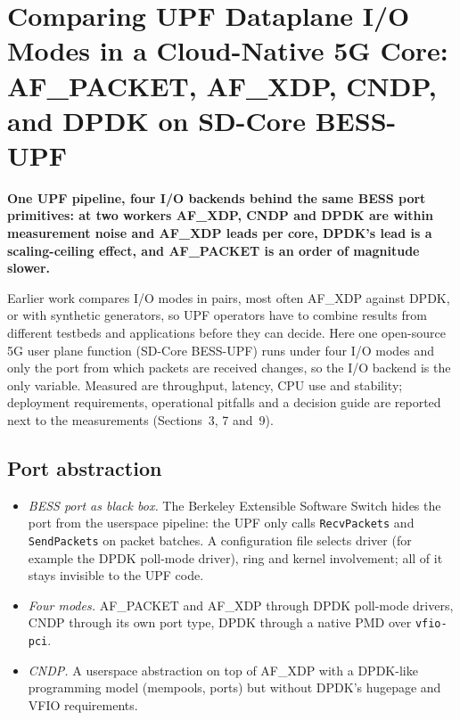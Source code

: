 \documentclass[11pt,a4paper]{article}
\newcommand{\finding}[1]{\textbf{#1}\par\smallskip}
\begin{document}
\null %
\clearpage

\begingroup
\small
\section*{\large\normalfont Comparing UPF Dataplane I/O Modes in a Cloud-Native 5G Core: AF\_PACKET, AF\_XDP, CNDP, and DPDK on SD-Core BESS-UPF~\cite{valia2026}}
\finding{One UPF pipeline, four I/O backends behind the same BESS port primitives: at two workers AF\_XDP, CNDP and DPDK are within measurement noise and AF\_XDP leads per core, DPDK's lead is a scaling-ceiling effect, and AF\_PACKET is an order of magnitude slower.}
Earlier work compares I/O modes in pairs, most often AF\_XDP against DPDK, or with synthetic generators, so UPF operators have to combine results from different testbeds and applications before they can decide.
Here one open-source 5G user plane function (SD-Core BESS-UPF) runs under four I/O modes and only the port from which packets are received changes, so the I/O backend is the only variable.
Measured are throughput, latency, CPU use and stability; deployment requirements, operational pitfalls and a decision guide are reported next to the measurements (Sections~3, 7 and~9).

\subsection*{\normalsize\normalfont Port abstraction}
\begin{itemize}
\setlength{\itemsep}{2pt}
\item \emph{BESS port as black box.}
The Berkeley Extensible Software Switch hides the port from the userspace pipeline: the UPF only calls \texttt{RecvPackets} and \texttt{SendPackets} on packet batches.
A configuration file selects driver (for example the DPDK poll-mode driver), ring and kernel involvement; all of it stays invisible to the UPF code.
\item \emph{Four modes.}
AF\_PACKET and AF\_XDP through DPDK poll-mode drivers, CNDP through its own port type, DPDK through a native PMD over \texttt{vfio-pci}.
\item \emph{CNDP.}
A userspace abstraction on top of AF\_XDP with a DPDK-like programming model (mempools, ports) but without DPDK's hugepage and VFIO requirements.
\end{itemize}
\end{document}
